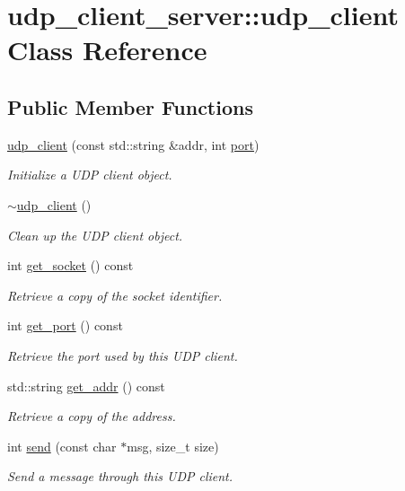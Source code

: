 \hypertarget{classudp__client__server_1_1udp__client}{}\section{udp\+\_\+client\+\_\+server\+:\+:udp\+\_\+client Class Reference}
\label{classudp__client__server_1_1udp__client}
\subsection*{Public Member Functions}
\begin{DoxyCompactItemize}
\item 
\hyperlink{classudp__client__server_1_1udp__client_a2d019e5e93a971262f3ee4476be0427a}{udp\+\_\+client} (const std\+::string \&addr, int \hyperlink{rollo__comm_8cpp_a63c89c04d1feae07ca35558055155ffb}{port})
\begin{DoxyCompactList}\small\item\em Initialize a U\+D\+P client object. \end{DoxyCompactList}\item 
\hyperlink{classudp__client__server_1_1udp__client_a2d86924b0df64eaa14db80ece0ab7812}{$\sim$udp\+\_\+client} ()
\begin{DoxyCompactList}\small\item\em Clean up the U\+D\+P client object. \end{DoxyCompactList}\item 
int \hyperlink{classudp__client__server_1_1udp__client_adb58b691a3fb90f86d6643e01123d528}{get\+\_\+socket} () const 
\begin{DoxyCompactList}\small\item\em Retrieve a copy of the socket identifier. \end{DoxyCompactList}\item 
int \hyperlink{classudp__client__server_1_1udp__client_ab4d8fc06bab9b1ab1435fa9d9a7bd9f8}{get\+\_\+port} () const 
\begin{DoxyCompactList}\small\item\em Retrieve the port used by this U\+D\+P client. \end{DoxyCompactList}\item 
std\+::string \hyperlink{classudp__client__server_1_1udp__client_a1fbf29e1facd0a802a5032aa0273af63}{get\+\_\+addr} () const 
\begin{DoxyCompactList}\small\item\em Retrieve a copy of the address. \end{DoxyCompactList}\item 
int \hyperlink{classudp__client__server_1_1udp__client_ac296d1fb6a6006bec5f8f14a81367d0a}{send} (const char $\ast$msg, size\+\_\+t size)
\begin{DoxyCompactList}\small\item\em Send a message through this U\+D\+P client. \end{DoxyCompactList}\end{DoxyCompactItemize}


